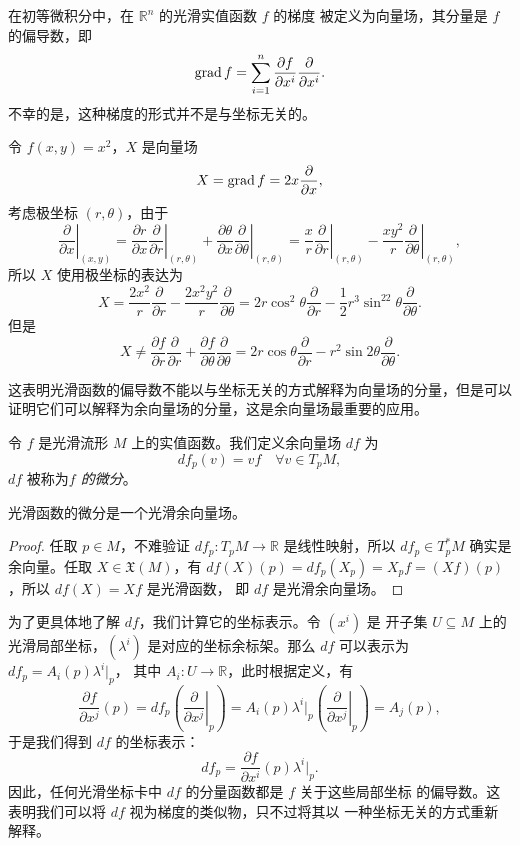 在初等微积分中，在 $\mathbb{R}^n$ 的光滑实值函数 $f$ 的梯度
被定义为向量场，其分量是 $f$ 的偏导数，即
\begin{equation}
  \operatorname{grad} f= \sum_{i=1}^n\frac{\partial f}{\partial x^i}\frac{\partial}{\partial x^i}.
\end{equation}
不幸的是，这种梯度的形式并不是与坐标无关的。

\begin{example}
  令 $f(x,y)=x^2$，$X$ 是向量场
  \[
    X=\operatorname{grad} f=2x\frac{\partial}{\partial x},  
  \]
  考虑极坐标 $(r,\theta)$，由于
  \[
    \left.\frac{\partial}{\partial x}\right|_{(x,y)} 
    =\frac{\partial r}{\partial x}\left.\frac{\partial}{\partial r}\right|_{(r,\theta)} 
    +\frac{\partial \theta}{\partial x}\left.\frac{\partial}{\partial \theta}\right|_{(r,\theta)} 
    =\frac{x}{r}\left.\frac{\partial}{\partial r}\right|_{(r,\theta)} 
    -\frac{xy^2}{r}\left.\frac{\partial}{\partial \theta}\right|_{(r,\theta)},
  \]
  所以 $X$ 使用极坐标的表达为
  \[
    X=  \frac{2x^2}{r}\frac{\partial}{\partial r}
    -\frac{2x^2y^2}{r}\frac{\partial}{\partial \theta}
    =2r\cos^2\theta\frac{\partial}{\partial r}-
    \frac{1}{2}r^3\sin^22\theta\frac{\partial}{\partial \theta}.
  \]
  但是
  \[
    X\neq \frac{\partial f}{\partial r}\frac{\partial}{\partial r}
    +\frac{\partial f}{\partial\theta}\frac{\partial}{\partial \theta}
    =2r\cos\theta  \frac{\partial}{\partial r}-r^2\sin 2\theta
    \frac{\partial}{\partial \theta}.
  \]
\end{example}

这表明光滑函数的偏导数不能以与坐标无关的方式解释为向量场的分量，但是可以
证明它们可以解释为余向量场的分量，这是余向量场最重要的应用。

令 $f$ 是光滑流形 $M$ 上的实值函数。我们定义余向量场 $df$ 为
\[
  df_p(v)=vf\quad \forall v\in T_pM,  
\]
$df$ 被称为\emph{$f$ 的微分}。

\begin{proposition}
  光滑函数的微分是一个光滑余向量场。
\end{proposition}
\begin{proof}
  任取 $p\in M$，不难验证 $df_p:T_pM\to \mathbb{R}$ 是线性映射，所以
  $df_p\in T_p^*M$ 确实是余向量。任取 $X\in \mathfrak{X}(M)$，有
  $df(X)(p)=df_p(X_p)=X_pf=(Xf)(p)$，所以 $df(X)=Xf$ 是光滑函数，
  即 $df$ 是光滑余向量场。
\end{proof}

为了更具体地了解 $df$，我们计算它的坐标表示。令 $\left(x^i\right)$ 是
开子集 $U\subseteq M$ 上的光滑局部坐标，$\left(\lambda^i\right)$
是对应的坐标余标架。那么 $df$ 可以表示为 $df_p=A_i(p)\lambda^i|_p$，
其中 $A_i:U\to \mathbb{R}$，此时根据定义，有
\[
  \frac{\partial f}{\partial x^j}(p)=df_p\left(\left.\frac{\partial}{\partial x^j}\right|_p\right)
  =  A_i(p)\lambda^i|_p \left(\left.\frac{\partial}{\partial x^j}\right|_p\right)
  =A_j(p),
\]
于是我们得到 $df$ 的坐标表示：
\begin{equation}\label{eq:coordinate represent of df}
  df_p=\frac{\partial f}{\partial x^i}(p)\lambda^i|_p.
\end{equation}
因此，任何光滑坐标卡中 $df$ 的分量函数都是 $f$ 关于这些局部坐标
的偏导数。这表明我们可以将 $df$ 视为梯度的类似物，只不过将其以
一种坐标无关的方式重新解释。

